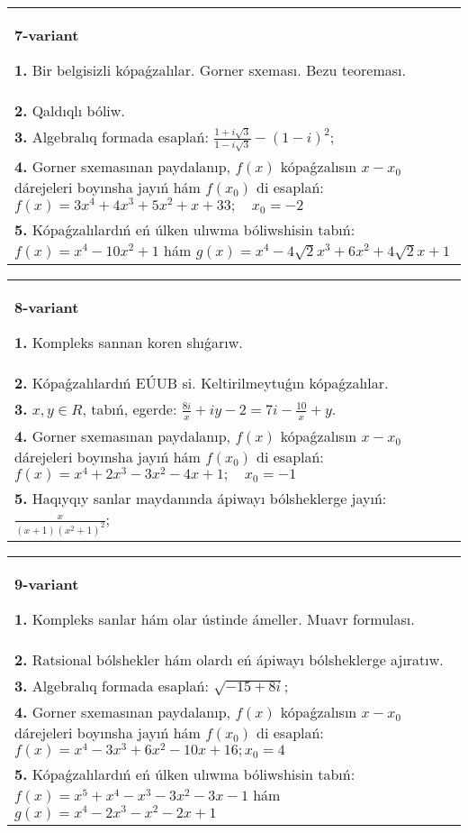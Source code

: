 \documentclass{article}
\begin{document}
\begin{tabular}{m{17cm}}
\textbf{7-variant}
\newline

\textbf{1.} Bir belgisizli kópaǵzalılar. Gorner sxeması. Bezu teoreması.  \\
\textbf{2.} Qaldıqlı bóliw.  \\
\textbf{3.} Algebralıq formada esaplań: $\frac{1+i \sqrt{3}}{1-i \sqrt{3}}-(1-i)^2$; \\
\textbf{4.} Gorner sxemasınan paydalanıp, $f(x)$ kópaǵzalısın $x-x_0$ dárejeleri boyınsha jayıń hám $f\left(x_0\right)$ di esaplań: $f(x)=3 x^4+4 x^3+5 x^2+x+33 ; \quad x_0=-2$ \\
\textbf{5.} Kópaǵzalılardıń eń úlken ulıwma bóliwshisin tabıń:  $f(x)=x^4-10 x^2+1$ hám $g(x)=x^4-4 \sqrt{2} x^3+6 x^2+4 \sqrt{2} x+1$ \\

\end{tabular}
\vspace{1cm}


\begin{tabular}{m{17cm}}
\textbf{8-variant}
\newline

\textbf{1.} Kompleks sannan koren shıǵarıw. \\
\textbf{2.} Kópaǵzalılardıń EÚUB si. Keltirilmeytuǵın   kópaǵzalılar. \\
\textbf{3.} $x, y \in R$, tabıń, egerde:  $\frac{8 i}{x}+i y-2=7 i-\frac{10}{x}+y$. \\
\textbf{4.} Gorner sxemasınan paydalanıp, $f(x)$ kópaǵzalısın $x-x_0$ dárejeleri boyınsha jayıń hám $f\left(x_0\right)$ di esaplań: $f(x)=x^4+2 x^3-3 x^2-4 x+1 ; \quad x_0=-1$ \\
\textbf{5.} Haqıyqıy sanlar maydanında ápiwayı bólsheklerge jayıń:  $\frac{x}{(x+1)\left(x^2+1\right)^2}$; \\

\end{tabular}
\vspace{1cm}


\begin{tabular}{m{17cm}}
\textbf{9-variant}
\newline

\textbf{1.} Kompleks sanlar hám olar ústinde ámeller. Muavr formulası.  \\
\textbf{2.} Ratsional bólshekler hám olardı eń ápiwayı bólsheklerge ajıratıw. \\
\textbf{3.} Algebralıq formada esaplań: $\sqrt{-15+8 i}$; \\
\textbf{4.} Gorner sxemasınan paydalanıp, $f(x)$ kópaǵzalısın $x-x_0$ dárejeleri boyınsha jayıń hám $f\left(x_0\right)$ di esaplań: $f(x)=x^4-3 x^3+6 x^2-10 x+16 ; x_0=4$ \\
\textbf{5.} Kópaǵzalılardıń eń úlken ulıwma bóliwshisin tabıń: $f(x)=x^5+x^4-x^3-3 x^2-3 x-1$ hám $g(x)=x^4-2 x^3-x^2-2 x+1$ \\

\end{tabular}
\vspace{1cm}
\end{document}
